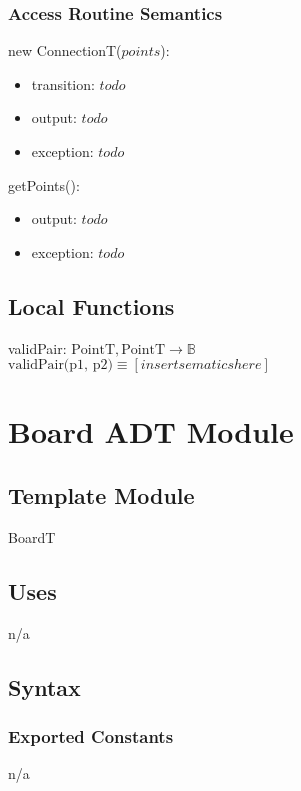 \documentclass[12pt]{article}
\begin{document}
\subsubsection* {Access Routine Semantics}
new ConnectionT($points$):
\begin{itemize}
    \item transition: $todo$
    \item output: $todo$
    \item exception: $todo$
\end{itemize}

\noindent getPoints():
\begin{itemize}
    \item output: $todo$
    \item exception: $todo$
\end{itemize}


\subsection*{Local Functions}
validPair: $\mbox{PointT}, \mbox{PointT} \rightarrow \mathbb{B}$\\
$\mbox{validPair(p1, p2)} \equiv [insert sematics here]$\\


\newpage
\section* {Board ADT Module}
\subsection*{Template Module}
BoardT


\subsection* {Uses}
n/a


\subsection* {Syntax}
\subsubsection* {Exported Constants}
n/a
\end{document}
